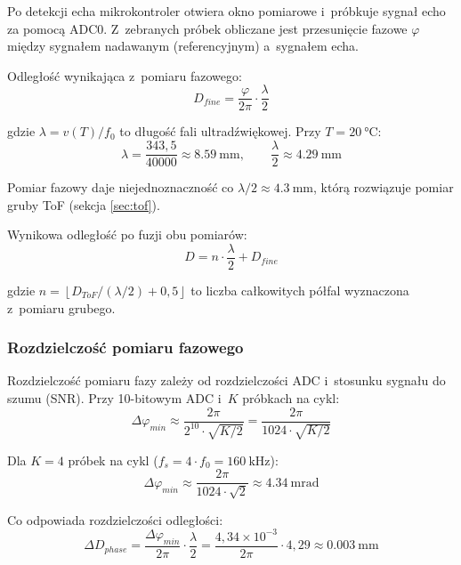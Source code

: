 \documentclass[a4paper,11pt]{article}
\begin{document}
Po detekcji echa mikrokontroler otwiera okno pomiarowe i~próbkuje sygnał
echo za pomocą ADC0. Z~zebranych próbek obliczane jest przesunięcie fazowe
$\varphi$ między sygnałem nadawanym (referencyjnym) a~sygnałem echa.

Odległość wynikająca z~pomiaru fazowego:
\begin{equation}
    D_{fine} = \frac{\varphi}{2\pi} \cdot \frac{\lambda}{2}
    \label{eq:phase}
\end{equation}

gdzie $\lambda = v(T) / f_0$ to długość fali ultradźwiękowej. Przy
$T = \SI{20}{\celsius}$:
\begin{equation}
    \lambda = \frac{343{,}5}{40000} \approx \SI{8,59}{\milli\metre}, \qquad
    \frac{\lambda}{2} \approx \SI{4,29}{\milli\metre}
    \label{eq:lambda}
\end{equation}

Pomiar fazowy daje niejednoznaczność co $\lambda/2 \approx \SI{4,3}{\milli\metre}$,
którą rozwiązuje pomiar gruby ToF (sekcja \ref{sec:tof}).

Wynikowa odległość po fuzji obu pomiarów:
\begin{equation}
    \boxed{D = n \cdot \frac{\lambda}{2} + D_{fine}}
    \label{eq:wynik}
\end{equation}

gdzie $n = \left\lfloor D_{ToF} / (\lambda/2) + 0{,}5 \right\rfloor$ to liczba
całkowitych półfal wyznaczona z~pomiaru grubego.

\subsubsection{Rozdzielczość pomiaru fazowego}

Rozdzielczość pomiaru fazy zależy od rozdzielczości ADC i~stosunku sygnału
do szumu (SNR). Przy 10-bitowym ADC i~$K$ próbkach na cykl:
\begin{equation}
    \Delta\varphi_{min} \approx \frac{2\pi}{2^{10} \cdot \sqrt{K/2}} = \frac{2\pi}{1024 \cdot \sqrt{K/2}}
    \label{eq:phase_res}
\end{equation}

Dla $K = 4$ próbek na cykl ($f_s = 4 \cdot f_0 = \SI{160}{\kilo\hertz}$):
\begin{equation}
    \Delta\varphi_{min} \approx \frac{2\pi}{1024 \cdot \sqrt{2}} \approx \SI{4,34}{\milli\radian}
\end{equation}

Co odpowiada rozdzielczości odległości:
\begin{equation}
    \Delta D_{phase} = \frac{\Delta\varphi_{min}}{2\pi} \cdot \frac{\lambda}{2}
    = \frac{4{,}34 \times 10^{-3}}{2\pi} \cdot 4{,}29 \approx \SI{0,003}{\milli\metre}
    \label{eq:phase_dist_res}
\end{equation}
\end{document}
